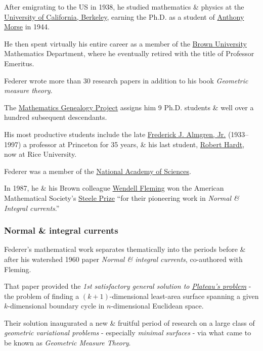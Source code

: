 \documentclass{article}
\begin{document}
After emigrating to the US in 1938, he studied mathematics \& physics at the \href{https://en.wikipedia.org/wiki/University_of_California,_Berkeley}{University of California, Berkeley}, earning the Ph.D. as a student of \href{https://en.wikipedia.org/wiki/Anthony_Morse}{Anthony Morse} in 1944.

He then spent virtually his entire career as a member of the \href{https://en.wikipedia.org/wiki/Brown_University}{Brown University} Mathematics Department, where he eventually retired with the title of Professor Emeritus.

%
Federer wrote more than 30 research papers in addition to his book \textit{Geometric measure theory}.

The \href{https://en.wikipedia.org/wiki/Mathematics_Genealogy_Project}{Mathematics Genealogy Project} assigns him 9 Ph.D. students \& well over a hundred subsequent descendants.

His most productive students include the late \href{https://en.wikipedia.org/wiki/Frederick_J._Almgren,_Jr.}{Frederick J. Almgren, Jr.} (1933--1997) a professor at Princeton for 35 years, \& his last student, \href{https://en.wikipedia.org/wiki/Robert_Miller_Hardt}{Robert Hardt}, now at Rice University.

%
Federer was a member of the \href{https://en.wikipedia.org/wiki/United_States_National_Academy_of_Sciences}{National Academy of Sciences}.

In 1987, he \& his Brown colleague \href{https://en.wikipedia.org/wiki/Wendell_Fleming}{Wendell Fleming} won the American Mathematical Society's \href{https://en.wikipedia.org/wiki/Steele_Prize}{Steele Prize} ``for their pioneering work in \textit{Normal \& Integral currents}.''

\subsubsection{Normal \& integral currents}
Federer's mathematical work separates thematically into the periods before \& after his watershed 1960 paper \textit{Normal \& integral currents}, co-authored with Fleming.

That paper provided the \textit{1st satisfactory general solution to \href{https://en.wikipedia.org/wiki/Plateau's_problem}{Plateau's problem}} - the problem of finding a $(k + 1)$-dimensional least-area surface spanning a given $k$-dimensional boundary cycle in $n$-dimensional Euclidean space.

Their solution inaugurated a new \& fruitful period of research on a large class of \textit{geometric variational problems} - especially \textit{minimal surfaces} - via what came to be known as \textit{Geometric Measure Theory}.
\end{document}
